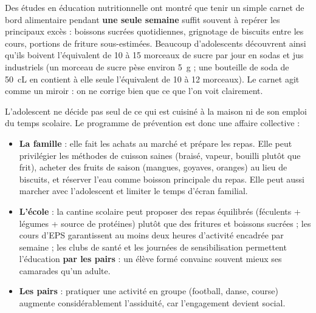 \documentclass[11pt]{article}
\newcounter{popsec}
\newcounter{popsub}
\newcommand{\courssub}[1]{%
  \stepcounter{popsub}%
  \par\vspace{9pt}\noindent{\popxbold\fontsize{11.5}{13}\selectfont\color{popink}{\color{poporange}\thepopsec.\thepopsub}\hspace{6pt}#1}\par\nopagebreak\vspace{4pt}
}
\begin{document}
\begin{savaistu}
Des études en éducation nutritionnelle ont montré que tenir un simple carnet de bord alimentaire pendant \textbf{une seule semaine} suffit souvent à repérer les principaux excès : boissons sucrées quotidiennes, grignotage de biscuits entre les cours, portions de friture sous-estimées. Beaucoup d'adolescents découvrent ainsi qu'ils boivent l'équivalent de 10 à 15 morceaux de sucre par jour en sodas et jus industriels (un morceau de sucre pèse environ \SI{5}{g} ; une bouteille de soda de \SI{50}{cL} en contient à elle seule l'équivalent de 10 à 12 morceaux). Le carnet agit comme un miroir : on ne corrige bien que ce que l'on voit clairement.
\end{savaistu}

\courssub{Le rôle de la famille et de l'école}

L'adolescent ne décide pas seul de ce qui est cuisiné à la maison ni de son emploi du temps scolaire. Le programme de prévention est donc une affaire collective :

\begin{itemize}
\item \textbf{La famille} : elle fait les achats au marché et prépare les repas. Elle peut privilégier les méthodes de cuisson saines (braisé, vapeur, bouilli plutôt que frit), acheter des fruits de saison (mangues, goyaves, oranges) au lieu de biscuits, et réserver l'eau comme boisson principale du repas. Elle peut aussi marcher avec l'adolescent et limiter le temps d'écran familial.
\item \textbf{L'école} : la cantine scolaire peut proposer des repas équilibrés (féculents + légumes + source de protéines) plutôt que des fritures et boissons sucrées ; les cours d'EPS garantissent au moins deux heures d'activité encadrée par semaine ; les clubs de santé et les journées de sensibilisation permettent l'éducation \textbf{par les pairs} : un élève formé convainc souvent mieux ses camarades qu'un adulte.
\item \textbf{Les pairs} : pratiquer une activité en groupe (football, danse, course) augmente considérablement l'assiduité, car l'engagement devient social.
\end{itemize}
\end{document}
